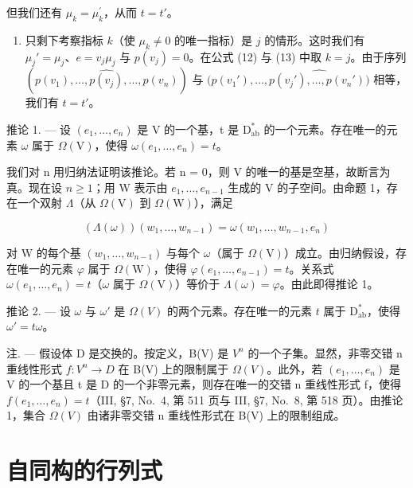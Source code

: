 但我们还有 \(\mu_{k} = \mu_{k}^{\prime}\)，从而 \(t = t'\)。

\begin{enumerate}
\def\labelenumi{\alph{enumi})}
\setcounter{enumi}{2}
\tightlist
\item
  只剩下考察指标 \(k\)（使 \(\mu_k \neq 0\) 的唯一指标）是 \(j\) 的情形。这时我们有 \(\mu_j' = \mu_j\)、\(e = v_j\mu_j\) 与 \(p(v_j) = 0\)。在公式 (12) 与 (13) 中取 \(k = j\)。由于序列 \((p(v_1), \ldots, \widehat{p(v_j)}, \ldots, p(v_n))\) 与 \((p(v_1'), \ldots, \widehat{p(v_j'), \ldots, p(v_n'))}\) 相等，我们有 \(t = t'\)。
\end{enumerate}

推论 1. --- 设 \((e_1, \ldots, e_n)\) 是 V 的一个基，t 是 \(\mathrm{D}_{\mathrm{ab}}^*\) 的一个元素。存在唯一的元素 \(\omega\) 属于 \(\Omega(\mathrm{V})\)，使得 \(\omega(e_1, \ldots, e_n) = t\)。

我们对 n 用归纳法证明该推论。若 n = 0，则 V 的唯一的基是空基，故断言为真。现在设 \(n \geqslant 1\)；用 W 表示由 \(e_{1}, \ldots, e_{n-1}\) 生成的 V 的子空间。由命题 1，存在一个双射 \(\Lambda\)（从 \(\Omega(\mathrm{V})\) 到 \(\Omega(\mathrm{W})\)），满足

\[
(\Lambda (\omega)) (w _ {1}, \ldots , w _ {n - 1}) = \omega (w _ {1}, \ldots , w _ {n - 1}, e _ {n})
\]

对 W 的每个基 \((w_{1},\ldots,w_{n-1})\) 与每个 \(\omega\)（属于 \(\Omega(\mathrm{V})\)）成立。由归纳假设，存在唯一的元素 \(\varphi\) 属于 \(\Omega(\mathrm{W})\)，使得 \(\varphi(e_{1},\ldots,e_{n-1})=t\)。关系式 \(\omega(e_{1},\ldots,e_{n})=t\)（\(\omega\) 属于 \(\Omega(\mathrm{V})\)）等价于 \(\Lambda(\omega)=\varphi\)。由此即得推论 1。

推论 2. --- 设 \(\omega\) 与 \(\omega'\) 是 \(\Omega(V)\) 的两个元素。存在唯一的元素 \(t\) 属于 \(\mathrm{D}_{\mathrm{ab}}^{*}\)，使得 \(\omega' = t\omega\)。

注. --- 假设体 D 是交换的。按定义，B(V) 是 \(V^{n}\) 的一个子集。显然，非零交错 n 重线性形式 \(f: V^{n} \to D\) 在 B(V) 上的限制属于 \(\Omega(V)\)。此外，若 \((e_{1}, \ldots, e_{n})\) 是 V 的一个基且 t 是 D 的一个非零元素，则存在唯一的交错 n 重线性形式 f，使得 \(f(e_{1}, \ldots, e_{n}) = t\)（III, §7, No.~4, 第 511 页与 III, §7, No.~8, 第 518 页）。由推论 1，集合 \(\Omega(V)\) 由诸非零交错 n 重线性形式在 B(V) 上的限制组成。

\section{自同构的行列式}

